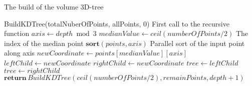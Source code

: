 \begin{algorithm}
\caption{The build of the volume 3D-tree}
\label{volume_kdtree_build}
\begin{algorithmic}
\State BuildKDTree(totalNuberOfPoints, allPoints, 0) \Comment First call to the recursive function
  \State $axis \gets depth \bmod 3$
  \State $medianValue \gets ceil(numberOfPoints / 2)$ \Comment The index of the median point
  \State $\textbf{sort}(points, axis)$ \Comment Parallel sort of the input point along axis
  \State $newCoordinate \gets points[medianValue][axis]$
  \State $leftChild \gets newCoordinate$
  \State $rightChild \gets newCoordinate$
  \State $tree \gets leftChild$
  \State $tree \gets rightChild$
  \State $\textbf{return}\, BuildKDTree(ceil(numberOfPoints / 2), remainPoints, depth+1)$
  \EndIf
\EndProcedure
\end{algorithmic}
\end{algorithm}